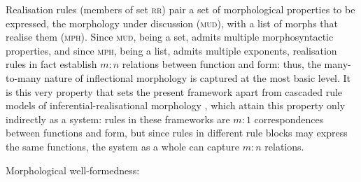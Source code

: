 \documentclass[output=paper,biblatex,babelshorthands,newtxmath,draftmode,colorlinks,citecolor=brown]{langscibook}
\begin{document}
\begin{exe}
\begin{xlist}
\begin{exe}
  \ex \label{ex:MudMS}

\end{exe}

Realisation rules (members of set \textsc{rr}) pair a set of
morphological properties to be expressed, the morphology under
discussion (\textsc{mud}), with a list of morphs that realise them
(\textsc{mph}). Since \textsc{mud}, being a set, admits multiple
morphosyntactic properties, and since \textsc{mph}, being a list,
admits multiple exponents, realisation rules in fact establish $m:n$
relations between function and form: thus, the many-to-many nature of
inflectional morphology is captured at the most basic level. It is this very
property that sets the present framework apart from cascaded rule models of
inferential-realisational morphology \citep{Anderson92,Stump01}, which
attain this property only indirectly as a system: rules in these
frameworks are $m:1$ correspondences between functions and form, but
since rules in different rule blocks may express the same functions,
the system as a whole can capture $m:n$ relations.

\ea
\label{ex-MCC}\label{morphology:morphology-well-formedness}
Morphological well-formedness:\\
\z


\end{xlist}
\end{exe}
\end{document}
